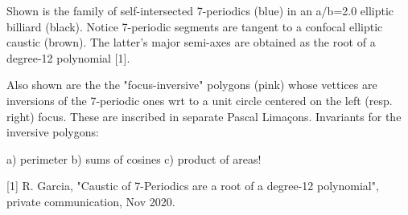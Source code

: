 Shown is the family of self-intersected 7-periodics (blue) in an a/b=2.0 elliptic billiard (black). Notice 7-periodic segments are tangent to a confocal elliptic caustic (brown). The latter's major semi-axes are obtained as the root of a degree-12 polynomial [1].

Also shown are the the "focus-inversive" polygons (pink) whose vettices are inversions of the 7-periodic ones wrt to a unit circle centered on the left (resp. right) focus. These are inscribed in separate Pascal Limaçons. Invariants for the inversive polygons:

a) perimeter
b) sums of cosines 
c) product of areas!

[1] R. Garcia, "Caustic of 7-Periodics are a root of a degree-12 polynomial", private communication, Nov 2020.